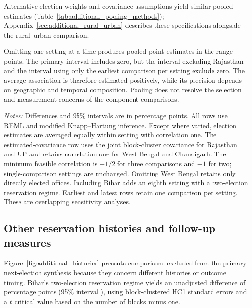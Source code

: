 Alternative election weights and covariance assumptions yield similar pooled estimates (Table~\ref{tab:additional_pooling_methods}); Appendix~\ref{sec:additional_rural_urban} describes these specifications alongside the rural--urban comparison.

Omitting one setting at a time produces pooled point estimates in the range \appMetaOmitRange{} points. The primary interval includes zero, but the interval excluding Rajasthan and the interval using only the earliest comparison per setting exclude zero. The average association is therefore estimated positively, while its precision depends on geographic and temporal composition. Pooling does not resolve the selection and measurement concerns of the component comparisons.

\begin{table}[!htbp]
\centering
\caption{Sensitivity of the pooled next-election comparison}
\label{tab:additional_meta}
\footnotesize
\setlength{\tabcolsep}{3pt}

\begin{minipage}{0.96\textwidth}\small
\emph{Notes:} Differences and 95\% intervals are in percentage points. All rows use REML and modified Knapp--Hartung inference. Except where varied, election estimates are averaged equally within setting with correlation one. The estimated-covariance row uses the joint block-cluster covariance for Rajasthan and UP and retains correlation one for West Bengal and Chandigarh. The minimum feasible correlation is $-1/2$ for three comparisons and $-1$ for two; single-comparison settings are unchanged. Omitting West Bengal retains only directly elected offices. Including Bihar adds an eighth setting with a two-election reservation regime. Earliest and latest rows retain one comparison per setting. These are overlapping sensitivity analyses.
\end{minipage}
\end{table}
\FloatBarrier


\subsection{Other reservation histories and follow-up measures}

Figure~\ref{fig:additional_histories} presents comparisons excluded from the primary next-election synthesis because they concern different histories or outcome timing. Bihar's two-election reservation regime yields an unadjusted difference of \appBiharEstimate{} percentage points (95\% interval \appBiharInterval{}), using block-clustered HC1 standard errors and a $t$ critical value based on the number of blocks minus one.

